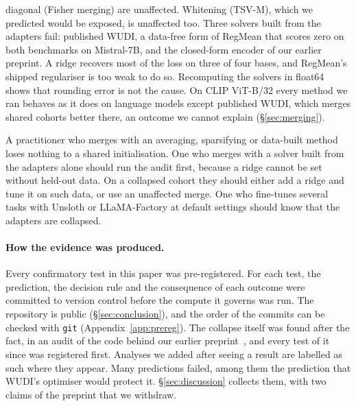 \begin{enumerate}[leftmargin=*,itemsep=2pt,topsep=3pt]
diagonal (Fisher merging) are unaffected. Whitening (TSV-M), which we
predicted would be exposed, is unaffected too. Three solvers built from the
adapters fail: published WUDI, a data-free form of RegMean that scores zero on
both benchmarks on Mistral-7B, and the closed-form encoder of our earlier
preprint. A ridge recovers most of the loss on three of four bases, and
RegMean's shipped regulariser is too weak to do so. Recomputing the solvers in
float64 shows that rounding error is not the cause. On CLIP ViT-B/32 every
method we ran behaves as it does on language models except published WUDI,
which merges shared cohorts better there, an outcome we cannot explain
(\S\ref{sec:merging}).
\end{enumerate}

A practitioner who merges with an averaging, sparsifying or data-built method
loses nothing to a shared initialisation. One who merges with a solver built
from the adapters alone should run the audit first, because a ridge cannot be
set without held-out data. On a collapsed cohort they should either add a
ridge and tune it on such data, or use an unaffected merge. One who fine-tunes
several tasks with Unsloth or LLaMA-Factory at default settings should know
that the adapters are collapsed.

\paragraph{How the evidence was produced.} Every confirmatory test in this
paper was pre-registered. For each test, the prediction, the decision rule and
the consequence of each outcome were committed to version control before the
compute it governs was run. The repository is public (\S\ref{sec:conclusion}),
and the order of the commits can be checked with \texttt{git}
(Appendix~\ref{app:prereg}). The collapse itself was found after the fact, in
an audit of the code behind our earlier preprint~\citep{pathak2026rd}, and
every test of it since was registered first. Analyses we added after seeing a
result are labelled as such where they appear. Many predictions failed, among
them the prediction that WUDI's optimiser would protect it.
\S\ref{sec:discussion} collects them, with two claims of the preprint that we
withdraw.

